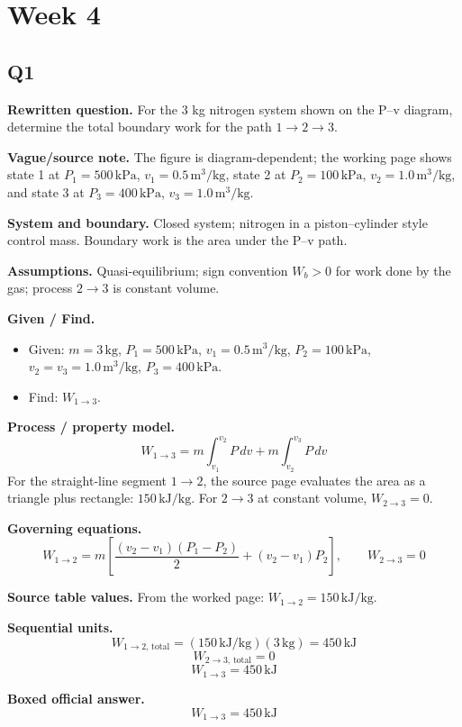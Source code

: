 \section*{Week 4}

\subsection*{Q1}
\textbf{Rewritten question.} For the 3 kg nitrogen system shown on the P--v diagram, determine the total boundary work for the path $1\to 2\to 3$.

\textbf{Vague/source note.} The figure is diagram-dependent; the working page shows state 1 at $P_1=500\,\text{kPa}$, $v_1=0.5\,\text{m}^3/\text{kg}$, state 2 at $P_2=100\,\text{kPa}$, $v_2=1.0\,\text{m}^3/\text{kg}$, and state 3 at $P_3=400\,\text{kPa}$, $v_3=1.0\,\text{m}^3/\text{kg}$.

\textbf{System and boundary.} Closed system; nitrogen in a piston--cylinder style control mass. Boundary work is the area under the P--v path.

\textbf{Assumptions.} Quasi-equilibrium; sign convention $W_b>0$ for work done by the gas; process $2\to 3$ is constant volume.

\textbf{Given / Find.}
\begin{itemize}
  \item Given: $m=3\,\text{kg}$, $P_1=500\,\text{kPa}$, $v_1=0.5\,\text{m}^3/\text{kg}$, $P_2=100\,\text{kPa}$, $v_2=v_3=1.0\,\text{m}^3/\text{kg}$, $P_3=400\,\text{kPa}$.
  \item Find: $W_{1\to 3}$.
\end{itemize}

\textbf{Process / property model.} 
\[
W_{1\to 3}=m\int_{v_1}^{v_2} P\,dv + m\int_{v_2}^{v_3} P\,dv
\]
For the straight-line segment $1\to 2$, the source page evaluates the area as a triangle plus rectangle: $150\,\text{kJ/kg}$.
For $2\to 3$ at constant volume, $W_{2\to 3}=0$.

\textbf{Governing equations.}
\[
W_{1\to 2}=m\left[\frac{(v_2-v_1)(P_1-P_2)}{2}+(v_2-v_1)P_2\right],\qquad W_{2\to 3}=0
\]

\textbf{Source table values.} From the worked page: $W_{1\to 2}=150\,\text{kJ/kg}$.

\textbf{Sequential units.}
\[
W_{1\to 2,\,\text{total}}=(150\,\text{kJ/kg})(3\,\text{kg})=450\,\text{kJ}
\]
\[
W_{2\to 3,\,\text{total}}=0
\]
\[
W_{1\to 3}=450\,\text{kJ}
\]

\textbf{Boxed official answer.}
\[
\boxed{W_{1\to 3}=450\,\text{kJ}}
\]

